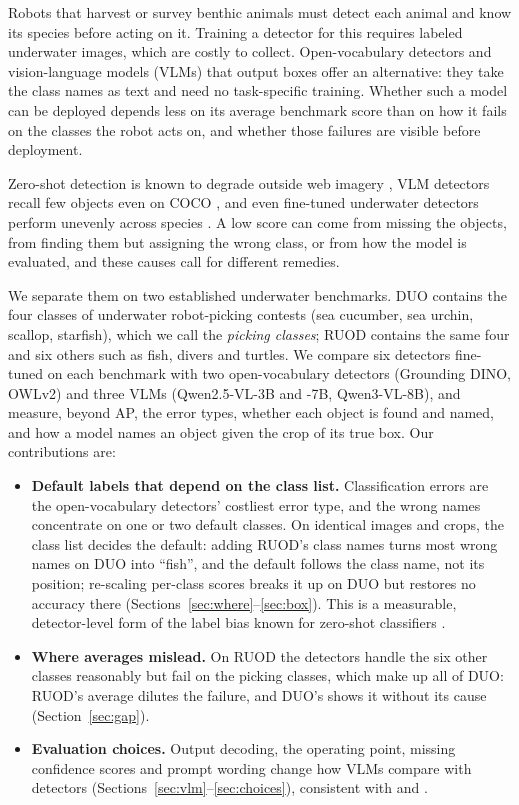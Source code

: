 \documentclass[letterpaper]{article} %
\begin{document}
Robots that harvest or survey benthic animals must detect each animal and know its species before acting on it. Training a detector for this requires labeled underwater images, which are costly to collect. Open-vocabulary detectors \citep{li2022glip,liu2024grounding,minderer2023scaling} and vision-language models (VLMs) that output boxes \citep{bai2025qwen25vl,bai2025qwen3vl} offer an alternative: they take the class names as text and need no task-specific training. Whether such a model can be deployed depends less on its average benchmark score than on how it fails on the classes the robot acts on, and whether those failures are visible before deployment.

Zero-shot detection is known to degrade outside web imagery \citep{robicheaux2025rf100vl}, VLM detectors recall few objects even on COCO \citep{fu2026wedetect}, and even fine-tuned underwater detectors perform unevenly across species \citep{wille2026marine}. A low score can come from missing the objects, from finding them but assigning the wrong class, or from how the model is evaluated, and these causes call for different remedies.

We separate them on two established underwater benchmarks. DUO \citep{liu2021duo} contains the four classes of underwater robot-picking contests (sea cucumber, sea urchin, scallop, starfish), which we call the \emph{picking classes}; RUOD \citep{fu2023ruod} contains the same four and six others such as fish, divers and turtles. We compare six detectors fine-tuned on each benchmark with two open-vocabulary detectors (Grounding DINO, OWLv2) and three VLMs (Qwen2.5-VL-3B and -7B, Qwen3-VL-8B), and measure, beyond AP, the error types, whether each object is found and named, and how a model names an object given the crop of its true box. Our contributions are:
\begin{itemize}
\item \textbf{Default labels that depend on the class list.} Classification errors are the open-vocabulary detectors' costliest error type, and the wrong names concentrate on one or two default classes. On identical images and crops, the class list decides the default: adding RUOD's class names turns most wrong names on DUO into ``fish'', and the default follows the class name, not its position; re-scaling per-class scores breaks it up on DUO but restores no accuracy there (Sections~\ref{sec:where}--\ref{sec:box}). This is a measurable, detector-level form of the label bias known for zero-shot classifiers \citep{zhao2021calibrate,zhu2023gla}.
\item \textbf{Where averages mislead.} On RUOD the detectors handle the six other classes reasonably but fail on the picking classes, which make up all of DUO: RUOD's average dilutes the failure, and DUO's shows it without its cause (Section~\ref{sec:gap}).
\item \textbf{Evaluation choices.} Output decoding, the operating point, missing confidence scores and prompt wording change how VLMs compare with detectors (Sections~\ref{sec:vlm}--\ref{sec:choices}), consistent with \citet{li2025aerialmlm} and \citet{robicheaux2025rf100vl}.
\end{itemize}
\end{document}

